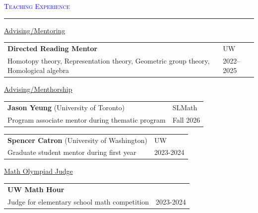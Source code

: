 \documentclass[10pt]{article}
\makeatletter
\newcommand{\grey}[1]{\textcolor{cvgrey}{#1}}
\newcommand{\altarray}[1]{
    \begin{tabular}{>{\raggedright\arraybackslash}p{13cm} @{\hskip 1cm} >{\raggedleft\arraybackslash}p{3.25cm}}
    #1
    \end{tabular}
}
\newenvironment{rSection}[1]{ %
  \medskip
  {\large\scshape\textcolor{Blue}{#1}} %
  \smallskip
  \hrule %
  \begin{list}{}{ %
    \setlength{\leftmargin}{0em} %
  }
  \item[]
}{
  \end{list}
}
\makeatother
\begin{document}
\begin{rSection}{Teaching Experience}
\underline{Advising/Mentoring}

\altarray{
    \textbf{Directed Reading Mentor} & \footnotesize UW\\
    \grey{Homotopy theory, Representation theory, Geometric group theory, Homological algebra} & \footnotesize \grey{2022--2025}
}

\underline{Advising/Menthorship}

\altarray{
    \textbf{Jason Yeung} (University of Toronto) & \footnotesize SLMath\\
    \grey{Program associate mentor during thematic program} & \footnotesize \grey{Fall 2026}
}
\altarray{
    \textbf{Spencer Catron} (University of Washington) & \footnotesize UW\\
    \grey{Graduate student mentor during first year} & \footnotesize
    \grey{2023-2024}
}

\underline{Math Olympiad Judge}

\altarray{
\textbf{UW Math Hour} \\
\grey{Judge for elementary school math competition} & \footnotesize \grey{2023-2024}
}


\end{rSection}
\end{document}
